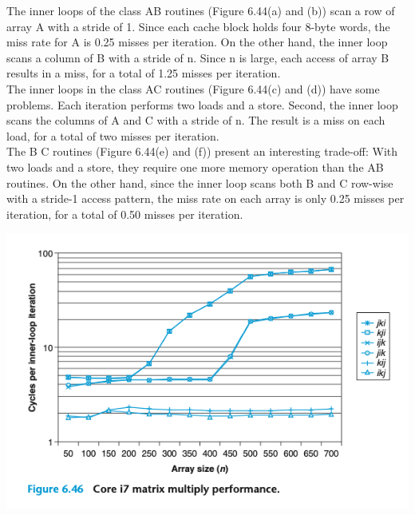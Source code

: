 \documentclass[11pt]{article}
\begin{document}
The inner loops of the class AB routines (Figure 6.44(a) and (b)) scan a row of array A with a stride of 1. Since each cache block holds four 8-byte words, the miss rate for A is 0.25 misses per iteration. On the other hand, the inner loop scans a column of B with a stride of n. Since n is large, each access of array B results in a miss, for a total of 1.25 misses per iteration.\\

The inner loops in the class AC routines (Figure 6.44(c) and (d)) have some problems. Each iteration performs two loads and a store. Second, the inner loop scans the columns of A and C with a stride of n. The result is a miss on each load, for a total of two misses per iteration.\\

The B C routines (Figure 6.44(e) and (f)) present an interesting trade-off: With two loads and a store, they require one more memory operation than the AB routines. On the other hand, since the inner loop scans both B and C row-wise with a stride-1 access pattern, the miss rate on each array is only 0.25 misses per iteration, for a total of 0.50 misses per iteration.\\


\begin{center}
\includegraphics[width=.9\linewidth]{pics/figure6.46-matrix-mltiply-performance.png}
\end{center}
\end{document}
